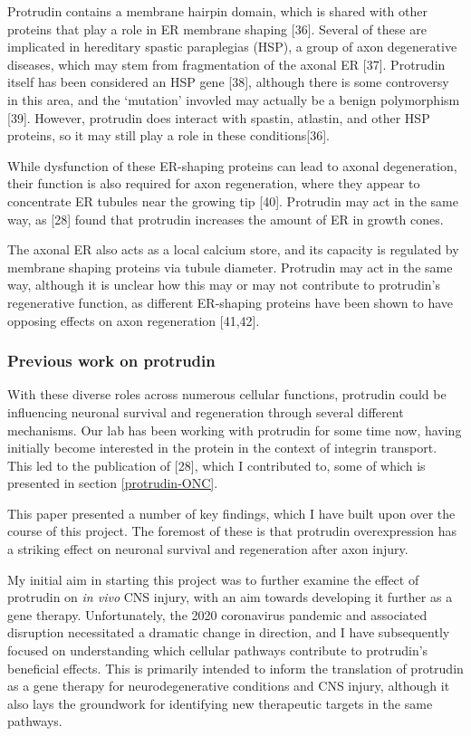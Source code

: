\documentclass[
  12pt,
  a4paper,
]{book}
\begin{document}
Protrudin contains a membrane hairpin domain, which is shared with other proteins that play a role in ER membrane shaping {[}36{]}. Several of these are implicated in hereditary spastic paraplegias (HSP), a group of axon degenerative diseases, which may stem from fragmentation of the axonal ER {[}37{]}. Protrudin itself has been considered an HSP gene {[}38{]}, although there is some controversy in this area, and the `mutation' invovled may actually be a benign polymorphism {[}39{]}. However, protrudin does interact with spastin, atlastin, and other HSP proteins, so it may still play a role in these conditions{[}36{]}.

While dysfunction of these ER-shaping proteins can lead to axonal degeneration, their function is also required for axon regeneration, where they appear to concentrate ER tubules near the growing tip {[}40{]}. Protrudin may act in the same way, as {[}28{]} found that protrudin increases the amount of ER in growth cones.

The axonal ER also acts as a local calcium store, and its capacity is regulated by membrane shaping proteins via tubule diameter. Protrudin may act in the same way, although it is unclear how this may or may not contribute to protrudin's regenerative function, as different ER-shaping proteins have been shown to have opposing effects on axon regeneration {[}41,42{]}.

\hypertarget{previous-work-on-protrudin}{%
\subsubsection{Previous work on protrudin}\label{previous-work-on-protrudin}}

With these diverse roles across numerous cellular functions, protrudin could be influencing neuronal survival and regeneration through several different mechanisms. Our lab has been working with protrudin for some time now, having initially become interested in the protein in the context of integrin transport. This led to the publication of {[}28{]}, which I contributed to, some of which is presented in section \ref{protrudin-ONC}.

This paper presented a number of key findings, which I have built upon over the course of this project. The foremost of these is that protrudin overexpression has a striking effect on neuronal survival and regeneration after axon injury.

My initial aim in starting this project was to further examine the effect of protrudin on \emph{in vivo} CNS injury, with an aim towards developing it further as a gene therapy. Unfortunately, the 2020 coronavirus pandemic and associated disruption necessitated a dramatic change in direction, and I have subsequently focused on understanding which cellular pathways contribute to protrudin's beneficial effects. This is primarily intended to inform the translation of protrudin as a gene therapy for neurodegenerative conditions and CNS injury, although it also lays the groundwork for identifying new therapeutic targets in the same pathways.
\end{document}
